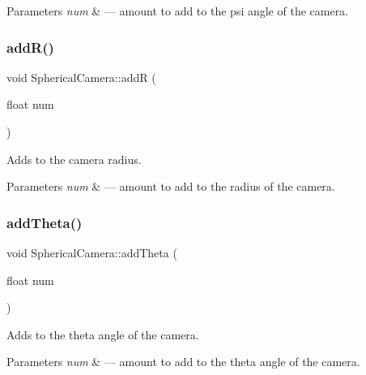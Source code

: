 \begin{DoxyParams}{Parameters}
{\em num} & --- amount to add to the psi angle of the camera. \\
\hline
\end{DoxyParams}
\mbox{\label{class_spherical_camera_a7153206babba00890a7706ed21987463}} 
\subsubsection{\texorpdfstring{add\+R()}{addR()}}
{\footnotesize\ttfamily void Spherical\+Camera\+::addR (\begin{DoxyParamCaption}\item[{float}]{num }\end{DoxyParamCaption})}



Adds to the camera radius. 


\begin{DoxyParams}{Parameters}
{\em num} & --- amount to add to the radius of the camera. \\
\hline
\end{DoxyParams}
\mbox{\label{class_spherical_camera_a2245b8a04f20971f46b6ac81d38c9df5}} 
\subsubsection{\texorpdfstring{add\+Theta()}{addTheta()}}
{\footnotesize\ttfamily void Spherical\+Camera\+::add\+Theta (\begin{DoxyParamCaption}\item[{float}]{num }\end{DoxyParamCaption})}



Adds to the theta angle of the camera. 


\begin{DoxyParams}{Parameters}
{\em num} & --- amount to add to the theta angle of the camera. \\
\hline
\end{DoxyParams}
\mbox{\label{class_spherical_camera_a1f827fbe32547f24341976e7b0449b30}} 
